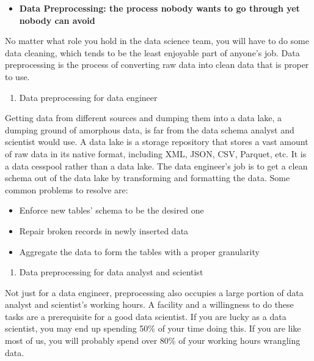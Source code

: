 \documentclass[
  12pt,
]{krantz}
\providecommand{\tightlist}{%
  \setlength{\itemsep}{0pt}\setlength{\parskip}{0pt}}
\begin{document}
\begin{itemize}
\tightlist
\item
  \textbf{Data Preprocessing: the process nobody wants to go through yet nobody can avoid}
\end{itemize}

No matter what role you hold in the data science team, you will have to do some data cleaning, which tends to be the least enjoyable part of anyone's job. Data preprocessing is the process of converting raw data into clean data that is proper to use.

\begin{enumerate}
\def\labelenumi{(\arabic{enumi})}
\tightlist
\item
  Data preprocessing for data engineer
\end{enumerate}

Getting data from different sources and dumping them into a data lake, a dumping ground of amorphous data, is far from the data schema analyst and scientist would use. A data lake is a storage repository that stores a vast amount of raw data in its native format, including XML, JSON, CSV, Parquet, etc. It is a data cesspool rather than a data lake. The data engineer's job is to get a clean schema out of the data lake by transforming and formatting the data. Some common problems to resolve are:

\begin{itemize}
\tightlist
\item
  Enforce new tables' schema to be the desired one
\item
  Repair broken records in newly inserted data
\item
  Aggregate the data to form the tables with a proper granularity
\end{itemize}

\begin{enumerate}
\def\labelenumi{(\arabic{enumi})}
\setcounter{enumi}{1}
\tightlist
\item
  Data preprocessing for data analyst and scientist
\end{enumerate}

Not just for a data engineer, preprocessing also occupies a large portion of data analyst and scientist's working hours. A facility and a willingness to do these tasks are a prerequisite for a good data scientist. If you are lucky as a data scientist, you may end up spending 50\% of your time doing this. If you are like most of us, you will probably spend over 80\% of your working hours wrangling data.
\end{document}
